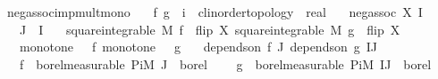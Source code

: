 \begin{isabelle_cm}
\isamarkupfalse%
\ neg{\isacharunderscore}{\kern0pt}assoc{\isacharunderscore}{\kern0pt}imp{\isacharunderscore}{\kern0pt}mult{\isacharunderscore}{\kern0pt}mono{\isacharcolon}{\kern0pt}\isanewline
\ \ \ f\ g\ {\isacharcolon}{\kern0pt}{\isacharcolon}{\kern0pt}\ {\isacartoucheopen}{\isacharparenleft}{\kern0pt}{\isacharprime}{\kern0pt}i\ {\isasymRightarrow}\ {\isacharprime}{\kern0pt}c{\isacharcolon}{\kern0pt}{\isacharcolon}{\kern0pt}linorder{\isacharunderscore}{\kern0pt}topology{\isacharparenright}{\kern0pt}\ {\isasymRightarrow}\ real{\isacartoucheclose}\isanewline
\ \ \ {\isacartoucheopen}neg{\isacharunderscore}{\kern0pt}assoc\ X\ I{\isacartoucheclose}\isanewline
\ \ \ {\isacartoucheopen}J\ {\isasymsubseteq}\ I{\isacartoucheclose}\isanewline
\ \ \ {\isacartoucheopen}square{\isacharunderscore}{\kern0pt}integrable\ M\ {\isacharparenleft}{\kern0pt}f\ {\isasymcirc}\ flip\ X{\isacharparenright}{\kern0pt}{\isacartoucheclose}\ {\isacartoucheopen}square{\isacharunderscore}{\kern0pt}integrable\ M\ {\isacharparenleft}{\kern0pt}g\ {\isasymcirc}\ flip\ X{\isacharparenright}{\kern0pt}{\isacartoucheclose}\isanewline
\ \ \ {\isacartoucheopen}monotone\ {\isacharparenleft}{\kern0pt}{\isasymle}{\isacharparenright}{\kern0pt}\ {\isacharparenleft}{\kern0pt}{\isasymle}{\isasymge}\isactrlbsub {\isasymeta}\isactrlesub {\isacharparenright}{\kern0pt}\ f{\isacartoucheclose}\ {\isacartoucheopen}monotone\ {\isacharparenleft}{\kern0pt}{\isasymle}{\isacharparenright}{\kern0pt}\ {\isacharparenleft}{\kern0pt}{\isasymle}{\isasymge}\isactrlbsub {\isasymeta}\isactrlesub {\isacharparenright}{\kern0pt}\ g{\isacartoucheclose}\isanewline
\ \ \ {\isacartoucheopen}depends{\isacharunderscore}{\kern0pt}on\ f\ J{\isacartoucheclose}\ {\isacartoucheopen}depends{\isacharunderscore}{\kern0pt}on\ g\ {\isacharparenleft}{\kern0pt}I{\isacharminus}{\kern0pt}J{\isacharparenright}{\kern0pt}{\isacartoucheclose}\isanewline
\ \ \ {\isacartoucheopen}f\ {\isasymin}\ borel{\isacharunderscore}{\kern0pt}measurable\ {\isacharparenleft}{\kern0pt}Pi\isactrlsub M\ J\ {\isacharparenleft}{\kern0pt}{\isasymlambda}{\isacharunderscore}{\kern0pt}{\isachardot}{\kern0pt}\ borel{\isacharparenright}{\kern0pt}{\isacharparenright}{\kern0pt}{\isacartoucheclose}\ \isanewline
\ \ \ {\isacartoucheopen}g\ {\isasymin}\ borel{\isacharunderscore}{\kern0pt}measurable\ {\isacharparenleft}{\kern0pt}Pi\isactrlsub M\ {\isacharparenleft}{\kern0pt}I{\isacharminus}{\kern0pt}J{\isacharparenright}{\kern0pt}\ {\isacharparenleft}{\kern0pt}{\isasymlambda}{\isacharunderscore}{\kern0pt}{\isachardot}{\kern0pt}\ borel{\isacharparenright}{\kern0pt}{\isacharparenright}{\kern0pt}{\isacartoucheclose}\isanewline

\end{isabelle_cm}
